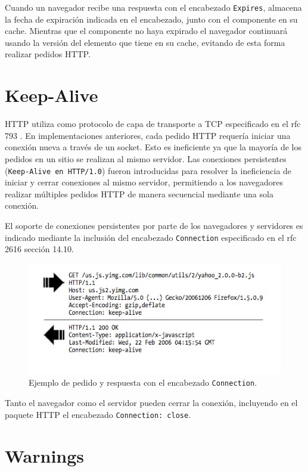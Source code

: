 \documentclass[a4paper,12pt]{report}
\begin{document}
Cuando un navegador recibe una respuesta con el encabezado \texttt{Expires}, almacena la fecha de expiración indicada en el encabezado, junto con el componente en su cache.
Mientras que el componente no haya expirado el navegador continuará usando la versión del elemento que tiene en su cache, evitando de esta forma realizar pedidos HTTP.

\section{Keep-Alive}

HTTP utiliza como protocolo de capa de transporte a TCP especificado en el rfc 793 \cite{rfc793}. En implementaciones anteriores, cada pedido HTTP requería
iniciar una conexión nueva a través de un socket. Esto es ineficiente ya que la mayoría de los pedidos en un sitio se realizan al mismo servidor.
Las conexiones persistentes (\texttt{Keep-Alive en HTTP/1.0}) fueron introducidas para resolver la ineficiencia de iniciar y cerrar conexiones al mismo servidor, permitiendo
a los navegadores realizar múltiples pedidos HTTP de manera secuencial mediante una sola conexión.

El soporte de conexiones persistentes por parte de los navegadores y servidores es indicado mediante la inclusión del encabezado \texttt{Connection}
especificado en el rfc 2616 \cite{rfc2616} sección 14.10.

\begin{figure}[h]
\centering
\includegraphics[width=1\textwidth]{figuras/apendice/keep-alive.jpg}
	\caption{Ejemplo de pedido y respuesta con el encabezado \texttt{Connection}.}
    \label{fig.keep-alive}
\end{figure}

Tanto el navegador como el servidor pueden cerrar la conexión, incluyendo en el paquete HTTP el encabezado \texttt{Connection: close}.

\section{Warnings}
\end{document}
